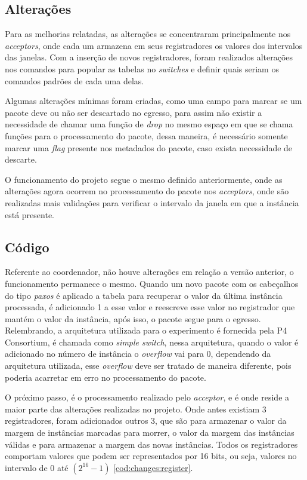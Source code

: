 \documentclass[
    12pt,
    openright, 
    oneside,
    a4paper,
    french,
    english,
    brazil
    ]{facom-ufu-abntex2}
\theoremstyle{definition}
\begin{document}
\subsection{Alterações}
Para as melhorias relatadas, as alterações se concentraram principalmente nos \emph{acceptors}, onde cada um armazena 
em seus registradores os valores dos intervalos das janelas. Com a inserção de novos registradores, foram
realizados alterações nos comandos para popular as tabelas no \emph{switches} e definir quais seriam os comandos padrões
de cada uma delas.

Algumas alterações mínimas foram criadas, como uma campo para marcar se um pacote deve ou não ser descartado no egresso,
para assim não existir a necessidade de chamar uma função de \emph{drop} no mesmo espaço em que se chama funções para o
processamento do pacote, dessa maneira, é necessário somente marcar uma \emph{flag} presente nos metadados do pacote,
caso exista necessidade de descarte.

O funcionamento do projeto segue o mesmo definido anteriormente, onde as alterações agora ocorrem no processamento
do pacote nos \emph{acceptors}, onde são realizadas mais validações para verificar o intervalo da janela em que a instância
está presente.

\subsection{Código}
Referente ao coordenador, não houve alterações em relação a versão anterior, o funcionamento permanece o mesmo.
Quando um novo pacote com os cabeçalhos do tipo \emph{paxos} é aplicado a tabela para recuperar o valor da última instância
processada, é adicionado 1 a esse valor e reescreve esse valor no registrador que mantém o valor da instância, após isso,
o pacote segue para o egresso. Relembrando, a arquitetura utilizada para o experimento é fornecida pela P4 Consortium, é
chamada como \emph{simple switch}, nessa arquitetura, quando o valor é adicionado no número de instância o \emph{overflow} vai para
0, dependendo da arquitetura utilizada, esse \emph{overflow} deve ser tratado de maneira diferente, pois poderia acarretar em
erro no processamento do pacote.



O próximo passo, é o processamento realizado pelo \emph{acceptor}, e é onde reside a maior parte das alterações realizadas no projeto.
Onde antes existiam 3 registradores, foram adicionados outros 3, que são para armazenar o valor da margem de instâncias marcadas
para morrer, o valor da margem das instâncias válidas e para armazenar a margem das novas instâncias. Todos os registradores
comportam valores que podem ser representados por 16 bits, ou seja, valores no intervalo de 0 até $(2^{16} - 1)$ \ref{cod:changes:register}.
\end{document}
